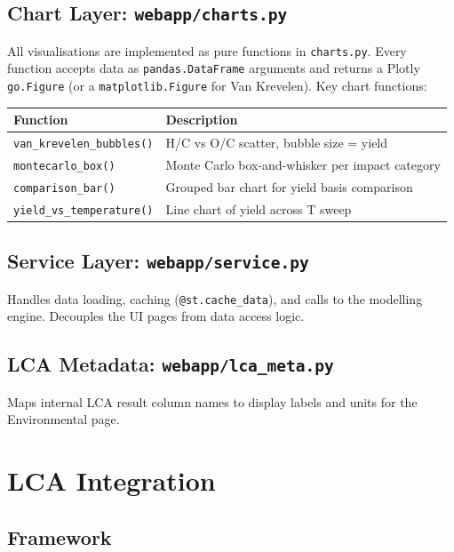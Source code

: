\documentclass[12pt, a4paper]{article}
\begin{document}
\subsection{Chart Layer: \texttt{webapp/charts.py}}

All visualisations are implemented as pure functions in \texttt{charts.py}. Every function accepts data as \texttt{pandas.DataFrame} arguments and returns a Plotly \texttt{go.Figure} (or a \texttt{matplotlib.Figure} for Van Krevelen). Key chart functions:

\begin{longtable}{ll}
\toprule
\textbf{Function} & \textbf{Description} \\
\midrule
\texttt{van\_krevelen\_bubbles()} & H/C vs O/C scatter, bubble size = yield \\
\texttt{montecarlo\_box()} & Monte Carlo box-and-whisker per impact category \\
\texttt{comparison\_bar()} & Grouped bar chart for yield basis comparison \\
\texttt{yield\_vs\_temperature()} & Line chart of yield across T sweep \\
\bottomrule
\end{longtable}

\subsection{Service Layer: \texttt{webapp/service.py}}

Handles data loading, caching (\texttt{@st.cache\_data}), and calls to the modelling engine. Decouples the UI pages from data access logic.

\subsection{LCA Metadata: \texttt{webapp/lca\_meta.py}}

Maps internal LCA result column names to display labels and units for the Environmental page.

\section{LCA Integration}

\subsection{Framework}
\end{document}
